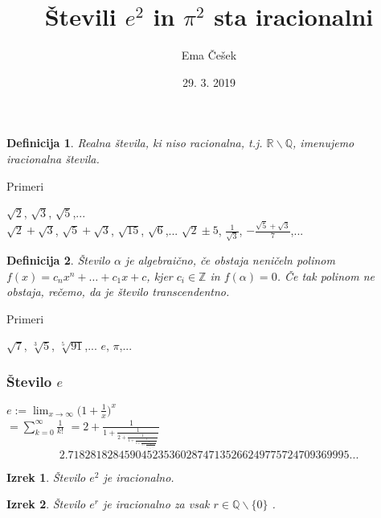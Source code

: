 \documentclass{beamer}
\title{Števili $e^2$ in $\pi^2$ sta iracionalni}
\author{Ema Češek}
\institute{Seminar, FMF}
\date{29. 3. 2019}
\newtheorem{izrek}{Izrek}
\newtheorem{definicija}{Definicija}
\begin{document}
\frame{\titlepage}

\begin{frame}

\begin{definicija}
 Realna števila, ki niso racionalna, t.j. $\mathbb{R}\backslash\mathbb{Q}$, imenujemo iracionalna števila.
\end{definicija}

\pause
\vskip 1cm

\begin{exampleblock}{Primeri}
\begin{center}
$\sqrt{2}$, $\sqrt{3}$, $\sqrt{5}$,... \\
\vskip 0.5cm
\pause
$\sqrt{2} + \sqrt{3}$, $\sqrt{5} + \sqrt{3}$, $\sqrt{15}$, $\sqrt{6}$,...
\vskip 0.5cm
\pause
$\sqrt{2}\pm 5$, $\frac{1}{\sqrt{3}}$, $-\frac{\sqrt{5}+\sqrt{3}}{7}$,...
\end{center}
\end{exampleblock}
\end{frame}

\begin{frame}
\begin{definicija}
Število $\alpha$ je algebraično, če obstaja neničeln polinom $f(x)=c_nx^n+\dots+c_1x+c$, kjer $c_i\in\mathbb{Z}$ in $f(\alpha)=0$. Če tak polinom ne obstaja, rečemo, da je število transcendentno.
\end{definicija}
\vskip1cm
\pause

\begin{exampleblock}{Primeri}
\begin{center}
$\sqrt{7}$, $\sqrt[3]{5}$, $\sqrt[5]{91}$,...
\vskip 0.5cm
$e$, $\pi$,...
\vskip 0.5cm
\end{center}
\end{exampleblock}
\end{frame}

\begin{frame}
\frametitle{Število $e$}

$e := \displaystyle \lim_{x\to \infty}\bigg(1+\frac{1}{x}\bigg)^x $ \\
\vskip 0.5cm
\quad $\displaystyle = \sum_{k=0}^{\infty}\frac{1}{k!}$
\vskip 0.5cm
\quad $ \displaystyle =2+\frac{1}{1+\frac{1}{2+\frac{1}{1+\frac{1}{1+\frac{1}{4+\frac{1}{1+\frac{1}{1+\frac{1}{6+...}}}}}}}}$ 
\vskip 0.5cm
\[ 2.71828182845904523536028747135266249775724709369995... \]

\end{frame}
 
\begin{frame}
\begin{izrek}
Število $e^2$ je iracionalno.  
\end{izrek}

\vskip 1cm
\pause

\begin{izrek}
Število $e^r$ je iracionalno za vsak $r\in\mathbb{Q}\backslash\{0\}$ .
\end{izrek}
\end{frame}
\end{document}
